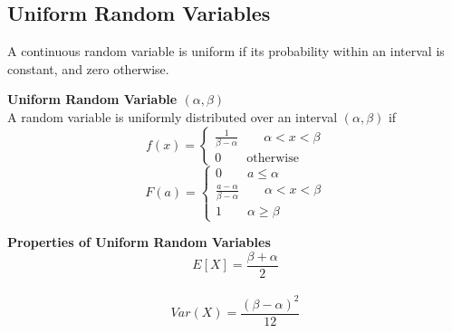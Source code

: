 \documentclass[10pt,a4paper]{article}
\begin{document}
   \subsection{Uniform Random Variables}
   A continuous random variable is uniform if its probability within an interval is constant, and zero otherwise.
    \begin{framed}
    	\centering\textbf{Uniform Random Variable $(\alpha, \beta)$} \\
    	A random variable is uniformly distributed over an interval $(\alpha, \beta)$ if
    	$$f(x)  = \begin{cases}
    	        \frac{1}{\beta - \alpha} \qquad \alpha < x < \beta\\
    	        0 \qquad \text{otherwise}
    	    \end{cases}$$
    	$$F(a)  = \begin{cases}
    	        0 \qquad a \leq \alpha \\
    	        \frac{a - \alpha}{\beta - \alpha} \qquad \alpha < x < \beta\\
    	        1 \qquad \alpha \geq \beta
    	    \end{cases}$$    
    \end{framed}    
    \begin{framed}
             	      		\centering\textbf{Properties of Uniform Random Variables}
             	      		$$E[X] = \frac{\beta + \alpha}{2}$$\\
             	      		$$Var(X) = \frac{(\beta - \alpha)^{2}}{12}$$
    \end{framed}
\end{document}
